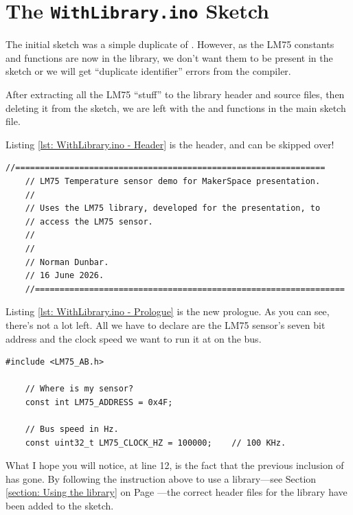 \chapter{The \texttt{WithLibrary.ino} Sketch}

The initial  sketch was a simple duplicate of . However, as the LM75 constants and functions are now in the library, we don't want them to be present in the sketch or we will get ``duplicate identifier'' errors from the compiler.

After extracting all the LM75 ``stuff'' to the library header and source files, then deleting it from the  sketch, we are left with the  and  functions in the main  sketch file.

Listing \ref{lst: WithLibrary.ino - Header} is the header, and can be skipped over!

\begin{lstlisting}[caption={WithLibrary.ino - Header.},label={lst: WithLibrary.ino - Header}, style=myArduino, firstnumber=1]
    //===============================================================
    // LM75 Temperature sensor demo for MakerSpace presentation.
    //
    // Uses the LM75 library, developed for the presentation, to
    // access the LM75 sensor.
    //
    //
    // Norman Dunbar.
    // 16 June 2026.
    //===============================================================
\end{lstlisting}

Listing \ref{lst: WithLibrary.ino - Prologue} is the new prologue. As you can see, there's not a lot left. All we have to declare are the LM75 sensor's seven bit address and the clock speed we want to run it at on the \twi{} bus.

\begin{lstlisting}[caption={WithLibrary.ino - Prologue.},label={lst: WithLibrary.ino - Prologue}, style=myArduino, firstnumber=12]
    #include <LM75_AB.h>

    // Where is my sensor?
    const int LM75_ADDRESS = 0x4F;

    // Bus speed in Hz.
    const uint32_t LM75_CLOCK_HZ = 100000;    // 100 KHz.
\end{lstlisting}

What I hope you will notice, at line 12, is the fact that the previous inclusion of  has gone. By following the instruction above to use a library---see Section \ref{section: Using the library} on Page \pageref{section: Using the library}---the correct header files for the library have been added to the sketch.


